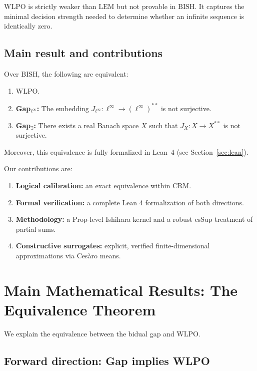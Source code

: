 \documentclass[11pt]{article}
\newcommand{\linf}{\ell^\infty}
\newcommand{\WLPO}{\mathrm{WLPO}}
\newcommand{\BISH}{\mathrm{BISH}}
\newcommand{\CRM}{\mathrm{CRM}}
\newcommand{\LEM}{\mathrm{LEM}}
\begin{document}
$\WLPO$ is strictly weaker than $\LEM$ but not provable in $\BISH$. It captures the minimal decision strength needed to determine whether an infinite sequence is identically zero.

\subsection{Main result and contributions}

\begin{thm}
Over $\BISH$, the following are equivalent:
\begin{enumerate}
\item $\WLPO$.
\item \textbf{Gap$_{\linf}$:} The embedding $J_{\linf}:\linf\to(\linf)^{**}$ is not surjective.
\item \textbf{Gap$_{\exists}$:} There exists a real Banach space $X$ such that $J_X:X\to X^{**}$ is not surjective.
\end{enumerate}
Moreover, this equivalence is fully formalized in Lean~4 (see Section~\ref{sec:lean}).
\end{thm}

Our contributions are:
\begin{enumerate}[label=\arabic*.]
\item \textbf{Logical calibration:} an exact equivalence within $\CRM$.
\item \textbf{Formal verification:} a complete Lean 4 formalization of both directions.
\item \textbf{Methodology:} a Prop-level Ishihara kernel and a robust csSup treatment of partial sums.
\item \textbf{Constructive surrogates:} explicit, verified finite-dimensional approximations via Ces\`aro means.
\end{enumerate}

\section{Main Mathematical Results: The Equivalence Theorem}

We explain the equivalence between the bidual gap and $\WLPO$.

\subsection{Forward direction: Gap implies WLPO}
\end{document}
